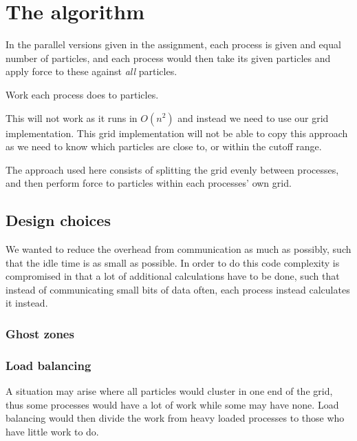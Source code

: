 \documentclass[a4paper,11pt,oneside]{book}
\begin{document}
\section{The algorithm}
In the parallel versions given in the assignment, each process is given and equal number of particles, and each process would then take its given particles and apply force to these against \emph{all} particles.


\IncMargin{1em}
\begin{algorithm}
\BlankLine
{}
\caption{Work each process does to particles.}\label{algo_disjdecomp}
\end{algorithm}\DecMargin{1em}

This will not work as it runs in $O(n^{2})$ and instead we need to use our grid implementation. This grid implementation will not be able to copy this approach as we need to know which particles are close to, or within the cutoff range.

The approach used here consists of splitting the grid evenly between processes, and then perform force to particles within each processes' own grid.

\subsection{Design choices}
We wanted to reduce the overhead from communication as much as possibly, such that the idle time is as small as possible. In order to do this code complexity is compromised in that a lot of additional calculations have to be done, such that instead of communicating small bits of data often, each process instead calculates it instead.

\subsubsection{Ghost zones}


\subsubsection{Load balancing}
A situation may arise where all particles would cluster in one end of the grid, thus some processes would have a lot of work while some may have none. Load balancing would then divide the work from heavy loaded processes to those who have little work to do.
\end{document}

